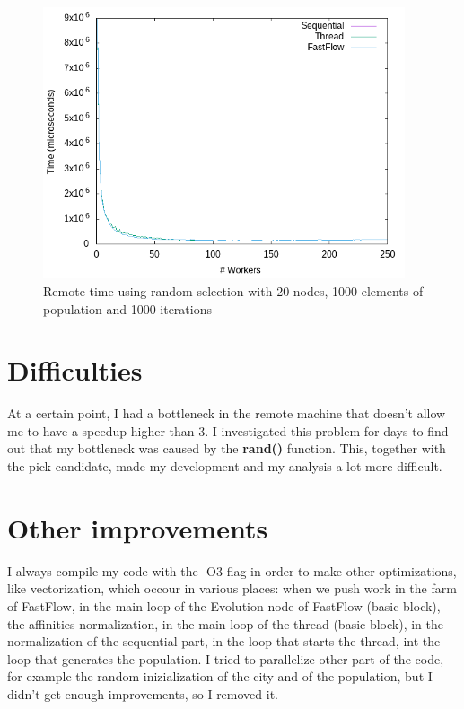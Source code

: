 \documentclass{article}
\begin{document}
    \begin{figure}
        \includegraphics[width=\linewidth,height=8cm]{img/remote_t_rand.png}
        \caption{Remote time using random selection with 20 nodes, 1000 elements of population and 1000 iterations}
        \label{fig:local_time}
    \end{figure}

    \section{Difficulties}
	At a certain point, I had a bottleneck in the remote machine that doesn't allow me to have a speedup higher than 3. I investigated this problem for days to find out that my bottleneck was caused by the \textbf{rand()} function. This, together with the pick candidate, made my development and my analysis a lot more difficult.

    \section{Other improvements}
	I always compile my code with the -O3 flag in order to make other optimizations, like vectorization, which occour in various places: when we push work in the farm of FastFlow, in the main loop of the Evolution node of FastFlow (basic block), the affinities normalization, in the main loop of the thread (basic block), in the normalization of the sequential part, in the loop that starts the thread, int the loop that generates the population. I tried to parallelize other part of the code, for example the random inizialization of the city and of the population, but I didn't get enough improvements, so I removed it.
\end{document}

